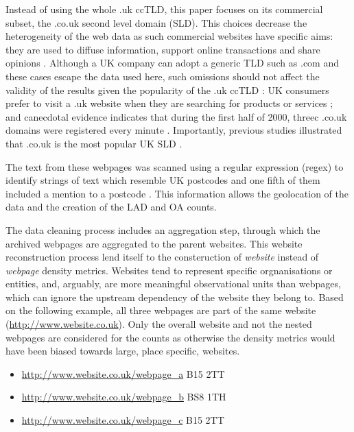 \documentclass[
  authoryear,
  preprint,
  3p]{elsarticle}
\begin{document}
Instead of using the whole .uk ccTLD, this paper focuses on its
commercial subset, the .co.uk second level domain (SLD). This choices
decrease the heterogeneity of the web data as such commercial websites
have specific aims: they are used to diffuse information, support online
transactions and share opinions
\citep{THELWALL2000441, blazquez2018big}. Although a UK company can
adopt a generic TLD such as .com and these cases escape the data used
here, such omissions should not affect the validity of the results given
the popularity of the .uk ccTLD \citep{tranosuk}: UK consumers prefer to
visit a .uk website when they are searching for products or services
\citep{hope}; and canecdotal evidence indicates that during the first
half of 2000, threec .co.uk domains were registered every minute
\citep{oecd_coms}. Importantly, previous studies illustrated that .co.uk
is the most popular UK SLD \citep{tranosuk}.

The text from these webpages was scanned using a regular expression
(regex) to identify strings of text which resemble UK postcodes and one
fifth of them included a mention to a postcode \citep{BL2013geo}. This
information allows the geolocation of the data and the creation of the
LAD and OA counts.

The data cleaning process includes an aggregation step, through which
the archived webpages are aggregated to the parent websites. This
website reconstruction process lend itself to the consteruction of
\emph{website} instead of \emph{webpage} density metrics. Websites tend
to represent specific orgnanisations or entities, and, arguably, are
more meaningful observational units than webpages, which can ignore the
upstream dependency of the website they belong to. Based on the
following example, all three webpages are part of the same website
(\url{http://www.website.co.uk}). Only the overall website and not the
nested webpages are considered for the counts as otherwise the density
metrics would have been biased towards large, place specific, websites.

\begin{itemize}
\item
  \url{http://www.website.co.uk/webpage_a} B15 2TT
\item
  \url{http://www.website.co.uk/webpage_b} BS8 1TH
\item
  \url{http://www.website.co.uk/webpage_c} B15 2TT
\end{itemize}
\end{document}
